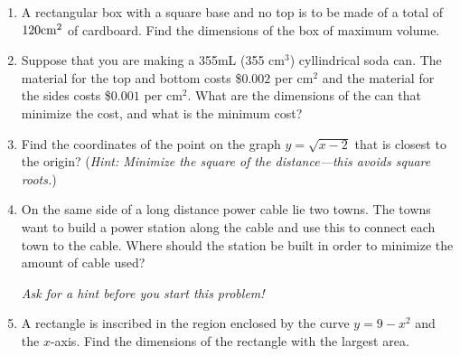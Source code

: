 \documentclass[11pt]{article}
\begin{document}
\drawtitle

\begin{enumerate}
\item A rectangular box with a square base and no top is to be made of
  a total of $120\rm{cm}^2$ of cardboard.  Find the dimensions of the
  box of maximum volume.

  \newpage
  
\item Suppose that you are making a 355mL (355 cm$^3$) cyllindrical
  soda can.  The material for the top and bottom costs \$$0.002$ per
  cm$^2$ and the material for the sides costs \$$0.001$ per
  cm$^2$. What are the dimensions of the can that minimize the cost,
  and what is the minimum cost?

  \newpage

\item Find the coordinates of the point on the graph $y=\sqrt{x-2}$
  that is closest to the origin? (\textit{Hint: Minimize the square of
    the distance---this avoids square roots.})

  \newpage

\item On the same side of a long distance power cable lie two towns.
  The towns want to build a power station along the cable and use this
  to connect each town to the cable.  Where should the station be
  built in order to minimize the amount of cable used?
  \begin{center}

    \textit{Ask for a hint before you start this problem!}
  \end{center}

  \newpage

\item A rectangle is inscribed in the region enclosed by the curve
  $y=9-x^2$ and the $x$-axis.  Find the dimensions of the rectangle
  with the largest area.

\end{enumerate}
\end{document}
